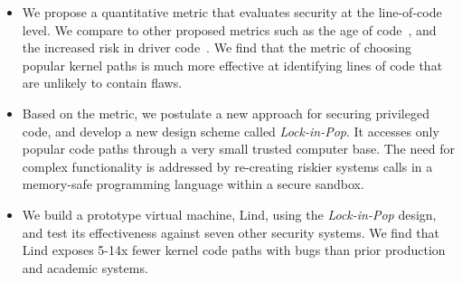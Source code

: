 \begin{itemize}\setlength\itemsep{0em}

\item
We propose a quantitative metric that evaluates security at the line-of-code 
level.  We compare to other proposed metrics
such as the age of code~\cite{ozment2006milk}, and
the increased risk in driver code~\cite{PittSFIeld}.  We find that the metric of
choosing popular kernel paths is much more effective at identifying lines of
code that are unlikely to contain flaws.

\item
Based on the metric, we postulate a new approach for securing privileged code, 
and develop a new design scheme called \emph{Lock-in-Pop}. It
accesses only popular code paths
through a very small trusted computer base.
The need for complex functionality is addressed by re-creating riskier systems calls
in a memory-safe programming language within a secure sandbox.

\item
We build a prototype virtual machine, Lind, using the \emph{Lock-in-Pop} design,
 and test its effectiveness against seven other security systems. We find that
Lind exposes 5-14x fewer kernel code paths with bugs than prior production and
academic systems.
\end{itemize}


